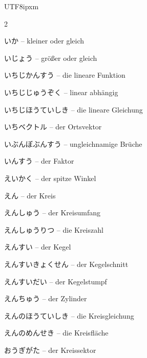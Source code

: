 \begin{CJK}{UTF8}{ipxm}
\begin{multicols}{2}
\par\nopagebreak
{} {\footnotesize\color{black!70}いか} -- kleiner oder gleich\dotfill\hyperref[e:65]{\pageref*{e:65}}\par
{} {\footnotesize\color{black!70}いじょう} -- größer oder gleich\dotfill\hyperref[e:66]{\pageref*{e:66}}\par
{} {\footnotesize\color{black!70}いちじかんすう} -- die lineare Funktion\dotfill\hyperref[e:119]{\pageref*{e:119}}\par
{} {\footnotesize\color{black!70}いちじじゅうぞく} -- linear abhängig\dotfill\hyperref[e:319]{\pageref*{e:319}}\par
{} {\footnotesize\color{black!70}いちじほうていしき} -- die lineare Gleichung\dotfill\hyperref[e:81]{\pageref*{e:81}}\par
{} {\footnotesize\color{black!70}いちベクトル} -- der Ortsvektor\dotfill\hyperref[e:302]{\pageref*{e:302}}\par
{} {\footnotesize\color{black!70}いぶんぼぶんすう} -- ungleichnamige Brüche\dotfill\hyperref[e:35]{\pageref*{e:35}}\par
{} {\footnotesize\color{black!70}いんすう} -- der Faktor\dotfill\hyperref[e:23]{\pageref*{e:23}}\par
{} {\footnotesize\color{black!70}えいかく} -- der spitze Winkel\dotfill\hyperref[e:157]{\pageref*{e:157}}\par
{} {\footnotesize\color{black!70}えん} -- der Kreis\dotfill\hyperref[e:211]{\pageref*{e:211}}\par
{} {\footnotesize\color{black!70}えんしゅう} -- der Kreisumfang\dotfill\hyperref[e:215]{\pageref*{e:215}}\par
{} {\footnotesize\color{black!70}えんしゅうりつ} -- die Kreiszahl\dotfill\hyperref[e:216]{\pageref*{e:216}}\par
{} {\footnotesize\color{black!70}えんすい} -- der Kegel\dotfill\hyperref[e:231]{\pageref*{e:231}}\par
{} {\footnotesize\color{black!70}えんすいきょくせん} -- der Kegelschnitt\dotfill\hyperref[e:312]{\pageref*{e:312}}\par
{} {\footnotesize\color{black!70}えんすいだい} -- der Kegelstumpf\dotfill\hyperref[e:236]{\pageref*{e:236}}\par
{} {\footnotesize\color{black!70}えんちゅう} -- der Zylinder\dotfill\hyperref[e:229]{\pageref*{e:229}}\par
{} {\footnotesize\color{black!70}えんのほうていしき} -- die Kreisgleichung\dotfill\hyperref[e:313]{\pageref*{e:313}}\par
{} {\footnotesize\color{black!70}えんのめんせき} -- die Kreisfläche\dotfill\hyperref[e:223]{\pageref*{e:223}}\par
{} {\footnotesize\color{black!70}おうぎがた} -- der Kreissektor\dotfill\hyperref[e:217]{\pageref*{e:217}}\par


\end{multicols}
\end{CJK}
